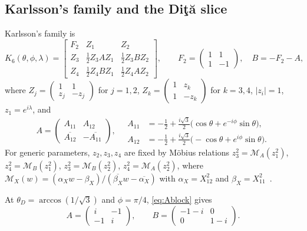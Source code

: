 \documentclass[11pt]{article}
\numberwithin{equation}{section}
\theoremstyle{plain}
\theoremstyle{definition}
\theoremstyle{remark}
\newcommand{\Dita}{\texorpdfstring{Di\c{t}\u{a}}{Dita}}
\begin{document}
\subsection{Karlsson's family and the \Dita{} slice}

Karlsson's family is~\cite{Karlsson2011}
\begin{equation}\label{eq:karlsson}
K_6(\theta,\phi,\lambda)=
\begin{bmatrix}
F_2 & Z_1 & Z_2\\
Z_3 & \tfrac12Z_3AZ_1 & \tfrac12Z_3BZ_2\\
Z_4 & \tfrac12Z_4BZ_1 & \tfrac12Z_4AZ_2
\end{bmatrix},\qquad
F_2=\begin{pmatrix}1&1\\1&-1\end{pmatrix},\quad B=-F_2-A,
\end{equation}
where $Z_j=\begin{pmatrix}1&1\\z_j&-z_j\end{pmatrix}$ for $j=1,2$, $Z_k=\begin{pmatrix}1&z_k\\1&-z_k\end{pmatrix}$ for $k=3,4$, $|z_i|=1$, $z_1=e^{i\lambda}$, and
\begin{equation}\label{eq:Ablock}
A=\begin{pmatrix}A_{11}&A_{12}\\\overline{A_{12}}&-\overline{A_{11}}\end{pmatrix},\quad
\begin{aligned}
A_{11}&=-\tfrac12+\tfrac{i\sqrt3}{2}\bigl(\cos\theta+e^{-i\phi}\sin\theta\bigr),\\
A_{12}&=-\tfrac12+\tfrac{i\sqrt3}{2}\bigl(-\cos\theta+e^{i\phi}\sin\theta\bigr).
\end{aligned}
\end{equation}
For generic parameters, $z_2,z_3,z_4$ are fixed by M\"obius relations $z_3^2=\mathcal M_A(z_1^2)$, $z_4^2=\mathcal M_B(z_1^2)$, $z_3^2=\mathcal M_B(z_2^2)$, $z_4^2=\mathcal M_A(z_2^2)$, where $\mathcal M_X(w)=(\alpha_Xw-\beta_X)/(\overline{\beta_X}w-\overline{\alpha_X})$ with $\alpha_X=X_{12}^2$ and $\beta_X=X_{11}^2$~\cite{Karlsson2011,McNultyWeigert2026}.

At $\theta_D=\arccos(1/\sqrt3)$ and $\phi=\pi/4$, \eqref{eq:Ablock} gives
\begin{equation}\label{eq:AB-dita}
A=\begin{pmatrix}i&-1\\-1&i\end{pmatrix},\qquad B=\begin{pmatrix}-1-i&0\\0&1-i\end{pmatrix}.
\end{equation}
\end{document}
